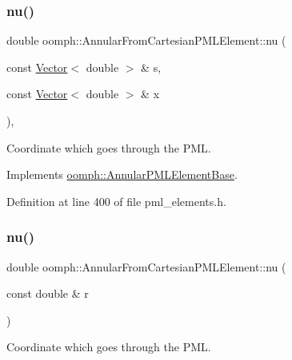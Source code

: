 \subsubsection{\texorpdfstring{nu()}{nu()}\hspace{0.1cm}{\footnotesize\ttfamily [1/2]}}
{\footnotesize\ttfamily double oomph\+::\+Annular\+From\+Cartesian\+P\+M\+L\+Element\+::nu (\begin{DoxyParamCaption}\item[{const \hyperlink{classoomph_1_1Vector}{Vector}$<$ double $>$ \&}]{s,  }\item[{const \hyperlink{classoomph_1_1Vector}{Vector}$<$ double $>$ \&}]{x }\end{DoxyParamCaption})\hspace{0.3cm}{\ttfamily [inline]}, {\ttfamily [virtual]}}



Coordinate which goes through the P\+ML. 



Implements \hyperlink{classoomph_1_1AnnularPMLElementBase_ac6671111f31c3a5012d0df53a1c24b76}{oomph\+::\+Annular\+P\+M\+L\+Element\+Base}.



Definition at line 400 of file pml\+\_\+elements.\+h.

\mbox{\label{classoomph_1_1AnnularFromCartesianPMLElement_a28f1b489affa8a37c0c0973cf9324157}} 
\subsubsection{\texorpdfstring{nu()}{nu()}\hspace{0.1cm}{\footnotesize\ttfamily [2/2]}}
{\footnotesize\ttfamily double oomph\+::\+Annular\+From\+Cartesian\+P\+M\+L\+Element\+::nu (\begin{DoxyParamCaption}\item[{const double \&}]{r }\end{DoxyParamCaption})\hspace{0.3cm}{\ttfamily [inline]}}



Coordinate which goes through the P\+ML. 



